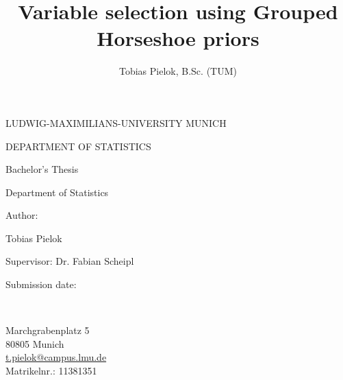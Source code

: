 \documentclass[12pt,letterpaper]{article}
\begin{document}
\begin{center}\uppercase{Ludwig-Maximilians-University Munich}\end{center}
\begin{center}\uppercase{Department of Statistics}\end{center}

\vspace{3cm}

\title{Variable selection using Grouped Horseshoe priors}
\date{\vspace{-5ex}}
{\let\newpage\relax\maketitle}
\thispagestyle{empty}


\begin{center}
  \begin{large}
    \begin{Large}
      Bachelor's Thesis\\
    \end{Large}
    Department of Statistics  \\
  \end{large}
\end{center}
\begin{center}
  Author:\\
  \begin{large}
    Tobias Pielok\\
  \end{large}
\end{center}
\vspace{1cm}
\begin{center}
  \begin{large}
    Supervisor: Dr. Fabian Scheipl
  \end{large}
\end{center}

\begin{center}  \begin{large}
    Submission date: \\%
  \end{large}
\end{center}

\vspace{1,5cm}

\begin{center}
  \begin{large}
    \author{Tobias Pielok, B.Sc. (TUM)}\\
 \end{large}
  Marchgrabenplatz 5\\ 
  80805 Munich\\ 
  \url{t.pielok@campus.lmu.de}\\
  Matrikelnr.:  11381351\\
\end{center}
\end{document}
